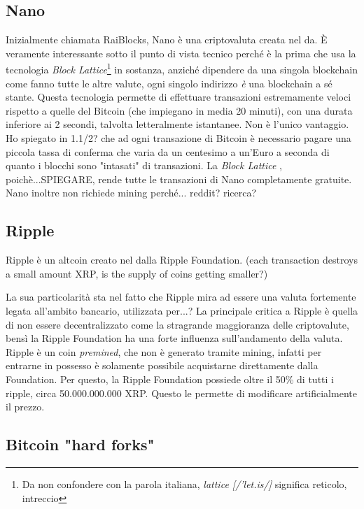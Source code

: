 \documentclass {article}
\begin{document}
{\subsection {Nano}


Inizialmente chiamata RaiBlocks, Nano è una criptovaluta creata nel da.
È veramente interessante sotto il punto di vista tecnico perché è la prima che usa la tecnologia \textit{Block Lattice}\footnote{Da non confondere con la parola italiana, \textit{lattice [/'let.is/]} significa reticolo, intreccio} in sostanza, anziché dipendere da una singola blockchain come fanno tutte le altre valute, ogni singolo indirizzo \emph{è} una blockchain a sé stante.
Questa tecnologia permette di effettuare transazioni estremamente veloci rispetto a quelle del Bitcoin (che impiegano in media 20 minuti), con una durata inferiore ai 2 secondi, talvolta letteralmente istantanee.
Non è l'unico vantaggio. Ho spiegato in 1.1/2? che ad ogni transazione di Bitcoin è necessario pagare una piccola tassa di conferma che varia da un centesimo a un'Euro a seconda di quanto i blocchi sono "intasati" di transazioni.
La \textit{Block Lattice} , poichè...SPIEGARE, rende tutte le transazioni di Nano completamente gratuite.
Nano inoltre non richiede mining perché... reddit? ricerca?


\subsection {Ripple}


Ripple è un altcoin creato nel dalla Ripple Foundation. (each transaction destroys a small amount XRP, is the supply of coins getting smaller?)

La sua particolarità sta nel fatto che Ripple mira ad essere una valuta fortemente legata all'ambito bancario, utilizzata per...?
La principale critica a Ripple è quella di non essere decentralizzato come la stragrande maggioranza delle criptovalute, bensì la Ripple Foundation ha una forte influenza sull'andamento della valuta.
Ripple è un coin \textit{premined}, che non è generato tramite mining, infatti per entrarne in possesso è solamente possibile acquistarne direttamente dalla Foundation.
Per questo, la Ripple Foundation possiede oltre il 50\% di tutti i ripple, circa 50.000.000.000 XRP. Questo le permette di modificare artificialmente il prezzo.


\subsection {Bitcoin "hard forks"}


}
\end{document}
